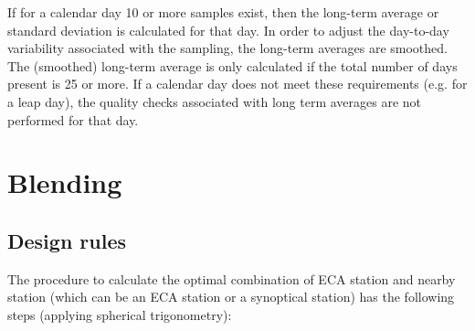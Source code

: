 \documentclass[a4paper,11pt]{article}
\begin{document}
If for a calendar day 10 or more samples exist, then the long-term
average or standard deviation is calculated for that day. In order to
adjust the day-to-day variability associated with the sampling, the
long-term averages are smoothed. The (smoothed) long-term average is
only calculated if the total number of days present is 25 or more. If
a calendar day does not meet these requirements (e.g. for a leap day),
the quality checks associated with long term averages are not
performed for that day.

\section{Blending}
\label{sec:blending}

\subsection{Design rules}
\label{sec:blendrules}

The procedure to calculate the optimal combination of ECA station and
nearby station (which can be an ECA station or a synoptical station)
has the following steps (applying spherical trigonometry):
\end{document}
